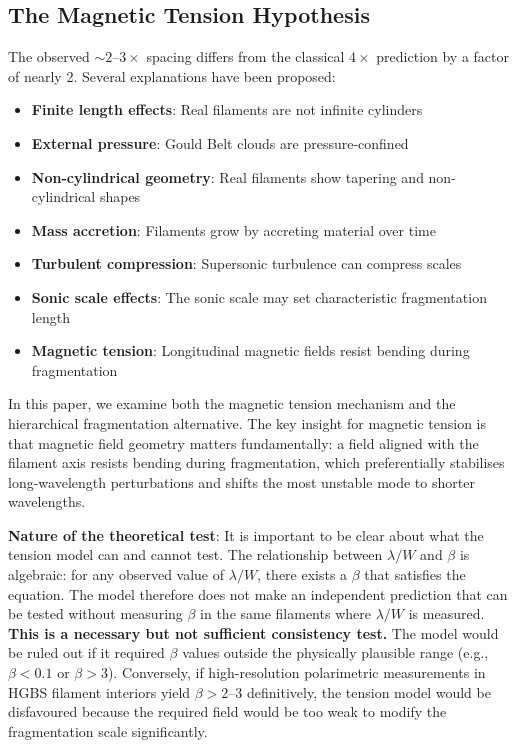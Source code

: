 \documentclass[11pt,a4paper]{article}
\begin{document}
\subsection{The Magnetic Tension Hypothesis}

The observed $\sim2$--$3\times$ spacing differs from the classical $4\times$ prediction by a factor of nearly 2. Several explanations have been proposed:

\begin{itemize}
    \item \textbf{Finite length effects}: Real filaments are not infinite cylinders \citep{Inutsuka1997}
    \item \textbf{External pressure}: Gould Belt clouds are pressure-confined \citep{Fischera2012}
    \item \textbf{Non-cylindrical geometry}: Real filaments show tapering and non-cylindrical shapes
    \item \textbf{Mass accretion}: Filaments grow by accreting material over time \citep{Heitsch2013, Chen2024}
    \item \textbf{Turbulent compression}: Supersonic turbulence can compress scales \citep{Padoan2011}
    \item \textbf{Sonic scale effects}: The sonic scale may set characteristic fragmentation length \citep{Federrath2016}
    \item \textbf{Magnetic tension}: Longitudinal magnetic fields resist bending during fragmentation
\end{itemize}

In this paper, we examine both the magnetic tension mechanism and the hierarchical fragmentation alternative. The key insight for magnetic tension is that magnetic field geometry matters fundamentally: a field aligned with the filament axis resists bending during fragmentation, which preferentially stabilises long-wavelength perturbations and shifts the most unstable mode to shorter wavelengths.

\textbf{Nature of the theoretical test}: It is important to be clear about what the tension model can and cannot test. The relationship between $\lambda/W$ and $\beta$ is algebraic: for any observed value of $\lambda/W$, there exists a $\beta$ that satisfies the equation. The model therefore does not make an independent prediction that can be tested without measuring $\beta$ in the same filaments where $\lambda/W$ is measured. \textbf{This is a necessary but not sufficient consistency test.} The model would be ruled out if it required $\beta$ values outside the physically plausible range (e.g., $\beta < 0.1$ or $\beta > 3$). Conversely, if high-resolution polarimetric measurements in HGBS filament interiors yield $\beta > 2$--$3$ definitively, the tension model would be disfavoured because the required field would be too weak to modify the fragmentation scale significantly.
\end{document}
